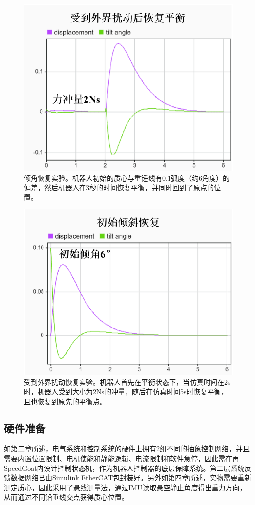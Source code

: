 \begin{figure}
  \centering
  \includegraphics[width=0.6\linewidth]{figures/Sec5/lqr1.png}
  \caption{
  倾角恢复实验。机器人初始的质心与重锤线有0.1弧度（约6角度）的偏差，然后机器人在3秒的时间恢复平衡，并同时回到了原点的位置。
  }
  \label{fig:sec5-lqr1}
   \vspace{6pt}
\end{figure}

\begin{figure}[h]
  \centering
  \includegraphics[width=0.6\linewidth]{figures/Sec5/lqr2.png}
  \caption{
  受到外界扰动恢复实验。机器人首先在平衡状态下，当仿真时间在2s时，机器人受到大小为2Ns的冲量，随后在仿真时间5s时恢复平衡，且也恢复到原先的平衡点。
  }
  \label{fig:sec5-lqr2}
   \vspace{6pt}
\end{figure}

\subsection{硬件准备}
如第二章所述，电气系统和控制系统的硬件上拥有2组不同的抽象控制网络，并且需要内置位置限制、电机使能和静能逻辑、电流限制和软件急停，因此需在再SpeedGoat内设计控制状态机，作为机器人控制器的底层保障系统。第二层系统反馈数据网络已由Simulink EtherCAT包封装好。另外如第四章所述，实物需要重新测定质心，因此采用了悬线测量法，通过IMU读取悬空静止角度得出重力方向，从而通过不同铅垂线交点获得质心位置。

